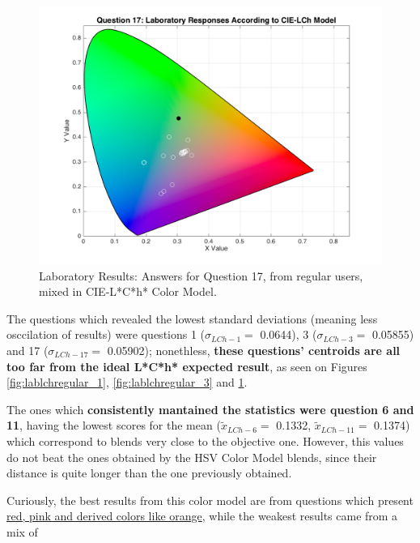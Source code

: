 \begin{figure}[htbp]
\begin{minipage}{0.3\textwidth}
    \label{fig:lablchregular_3}
  \end{minipage}\hfill
  \begin{minipage}{0.3\textwidth}
    \centering
    \includegraphics[width=\textwidth]{images/17_lab_LChresponses.png}
    \caption[Laboratory Results: Answers for Question 17, from regular users, mixed in CIE-L*C*h* Color Model.]{Laboratory Results: Answers for Question 17, from regular users, mixed in CIE-L*C*h* Color Model.}
    \label{fig:lablchregular_17}
  \end{minipage}
\end{figure}
%
The questions which revealed the lowest standard deviations (meaning less osccilation of results) were questions 1 ($\sigma_{LCh-1} = $ 0.0644), 3 ($\sigma_{LCh-3} = $ 0.05855) and 17 ($\sigma_{LCh-17} = $ 0.05902); nonethless, \textbf{these questions' centroids are all too far from the ideal L*C*h* expected
result}, as seen on Figures \ref{fig:lablchregular_1}, \ref{fig:lablchregular_3} and \ref{fig:lablchregular_17}. \par
%
The ones which \textbf{consistently mantained the statistics were question 6 and 11}, having the lowest scores for the mean ($\tilde{x}_{LCh-6} = $ 0.1332, $\tilde{x}_{LCh-11} = $ 0.1374) which correspond to blends very close to the objective one. However, this values do not beat the ones obtained by the HSV
Color Model blends, since their distance is quite longer than the one previously obtained. \par
%
Curiously, the best results from this color model are from questions which present \ul{red, pink and derived colors like orange}, while the weakest results came from a mix of
